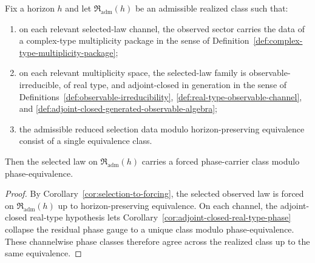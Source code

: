 \begin{corollary}
\label{cor:realized-phase-from-adjoint-closed-real-type}
Fix a horizon $h$ and let $\mathfrak R_{\mathrm{adm}}(h)$ be an admissible
realized class such that:
\begin{enumerate}[label=(\roman*), leftmargin=2em, itemsep=0.2em]
\item on each relevant selected-law channel, the observed sector carries the
      data of a complex-type multiplicity package in the sense of
      Definition~\ref{def:complex-type-multiplicity-package};
\item on each relevant multiplicity space, the selected-law family is
      observable-irreducible, of real type, and adjoint-closed in generation
      in the sense of Definitions~\ref{def:observable-irreducibility},
      \ref{def:real-type-observable-channel}, and
      \ref{def:adjoint-closed-generated-observable-algebra};
\item the admissible reduced selection data modulo horizon-preserving
      equivalence consist of a single equivalence class.
\end{enumerate}
Then the selected law on $\mathfrak R_{\mathrm{adm}}(h)$ carries a forced
phase-carrier class modulo phase-equivalence.
\end{corollary}

\begin{proof}
By Corollary~\ref{cor:selection-to-forcing}, the selected observed law is
forced on $\mathfrak R_{\mathrm{adm}}(h)$ up to horizon-preserving
equivalence. On each channel, the adjoint-closed real-type hypothesis lets
Corollary~\ref{cor:adjoint-closed-real-type-phase} collapse the residual phase
gauge to a unique class modulo phase-equivalence. These channelwise phase
classes therefore agree across the realized class up to the same equivalence.
\end{proof}

